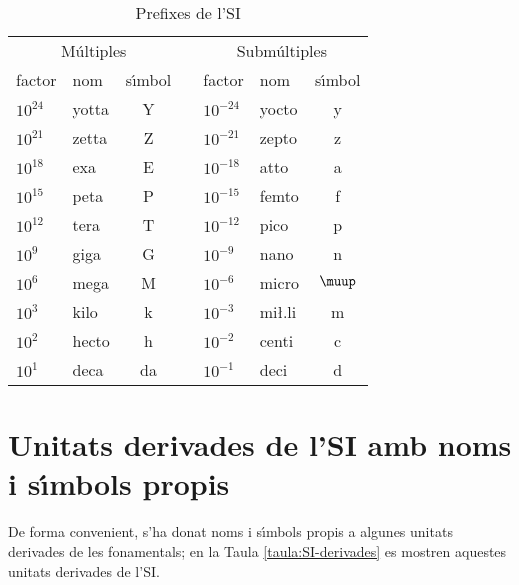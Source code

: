 \begin{table}[h]
   \caption{\label{taula:SI-prefixes} Prefixes de  l'SI}
   \begin{center}\begin{tabular}{llccllc}
   \toprule[1pt]
   \multicolumn{3}{c}{M\'{u}ltiples} & & \multicolumn{3}{c}{Subm\'{u}ltiples}\\
   \cmidrule(rl){1-3} \cmidrule(rl){5-7}
   factor & nom & s\'{\i}mbol & & factor & nom & s\'{\i}mbol\\
   \midrule
    $10^{24}$ &  yotta & Y & & $10^{-24}$ & yocto & y \\
    $10^{21}$ &  zetta & Z & & $10^{-21}$ & zepto & z \\
    $10^{18}$ &  exa & E & & $10^{-18}$ & atto & a \\
    $10^{15}$ &  peta & P & & $10^{-15}$ & femto & f \\
    $10^{12}$ &  tera & T & & $10^{-12}$ & pico & p \\
    $10^{9}$ &  giga & G & & $10^{-9}$ & nano & n \\
    $10^{6}$ &  mega & M & & $10^{-6}$ & micro & $\micro$ \\
    $10^{3}$ &  kilo & k & & $10^{-3}$ & mi{\l.l}i & m \\
    $10^{2}$ &  hecto & h & & $10^{-2}$ & centi & c \\
    $10^{1}$ &  deca & da & & $10^{-1}$ & deci & d \\
    \bottomrule[1pt]
   \end{tabular} \end{center}
\end{table}
      
      
     



\section{Unitats derivades de l'SI amb noms i s\'{\i}mbols propis}

De forma convenient, s'ha donat noms i s\'{\i}mbols propis a algunes unitats derivades de les fonamentals; en la Taula \vref{taula:SI-derivades} es mostren aquestes unitats derivades de l'SI.


